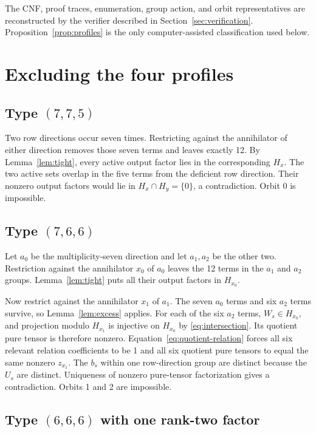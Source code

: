 \documentclass[10pt]{article}
\theoremstyle{remark}
\begin{document}
The CNF, proof traces, enumeration, group action, and orbit representatives are
reconstructed by the verifier described in Section~\ref{sec:verification}.
Proposition~\ref{prop:profiles} is the only computer-assisted classification
used below.

\section{Excluding the four profiles}

\subsection{\texorpdfstring{Type $(7,7,5)$}{Type (7,7,5)}}

Two row directions occur seven times.  Restricting against the annihilator of
either direction removes those seven terms and leaves exactly 12.  By
Lemma~\ref{lem:tight}, every active output factor lies in the corresponding
$H_x$.  The two active sets overlap in the five terms from the deficient row
direction.  Their nonzero output factors would lie in
$H_x\cap H_y=\{0\}$, a contradiction.  Orbit 0 is impossible.

\subsection{\texorpdfstring{Type $(7,6,6)$}{Type (7,6,6)}}

Let $a_0$ be the multiplicity-seven direction and let $a_1,a_2$ be the other
two.  Restriction against the annihilator $x_0$ of $a_0$ leaves the 12 terms in
the $a_1$ and $a_2$ groups.  Lemma~\ref{lem:tight} puts all their output
factors in $H_{x_0}$.

Now restrict against the annihilator $x_1$ of $a_1$.  The seven $a_0$ terms
and six $a_2$ terms survive, so Lemma~\ref{lem:excess} applies.  For each of
the six $a_2$ terms, $W_s\in H_{x_0}$, and projection modulo $H_{x_1}$ is
injective on $H_{x_0}$ by \eqref{eq:intersection}.  Its quotient pure tensor
is therefore nonzero.  Equation~\eqref{eq:quotient-relation} forces all six
relevant relation coefficients to be 1 and all six quotient pure tensors to
equal the same nonzero $z_{x_1}$.  The $b_s$ within one row-direction group
are distinct because the $U_s$ are distinct.  Uniqueness of nonzero pure-tensor
factorization gives a contradiction.  Orbits 1 and 2 are impossible.

\subsection{\texorpdfstring{Type $(6,6,6)$ with one rank-two factor}{Type (6,6,6) with one rank-two factor}}
\end{document}
